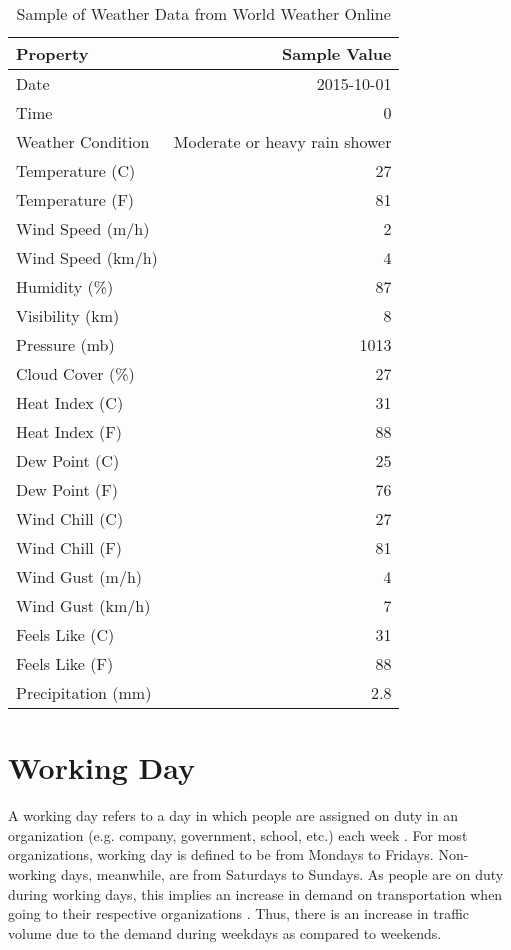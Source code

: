 \begin{table}[h]
	\centering
	\caption{Sample of Weather Data from World Weather Online}
	\label{table:sample_worldweatheronline_weather_data}
	\begin{tabular}{|l|r|}
		\hline
          Property & Sample Value \\ \hline
          Date & 2015-10-01 \\ \hline
          Time & 0 \\ \hline
          Weather Condition & Moderate or heavy rain shower \\ \hline
          Temperature (\textdegree{}C) & 27 \\ \hline
          Temperature (\textdegree{}F) & 81 \\ \hline
          Wind Speed (m/h) & 2 \\ \hline
          Wind Speed (km/h) & 4 \\ \hline
          Humidity (\%) & 87 \\ \hline
          Visibility (km) & 8 \\ \hline
          Pressure (mb) & 1013 \\ \hline
          Cloud Cover (\%) & 27 \\ \hline
          Heat Index (\textdegree{}C) & 31 \\ \hline
          Heat Index (\textdegree{}F) & 88 \\ \hline
          Dew Point (\textdegree{}C) & 25 \\ \hline
          Dew Point (\textdegree{}F) & 76 \\ \hline
          Wind Chill (\textdegree{}C) & 27 \\ \hline
          Wind Chill (\textdegree{}F) & 81 \\ \hline
          Wind Gust (m/h) & 4 \\ \hline
          Wind Gust (km/h) & 7 \\ \hline
          Feels Like (\textdegree{}C) & 31 \\ \hline
          Feels Like (\textdegree{}F) & 88 \\ \hline
          Precipitation (mm) & 2.8 \\ \hline
	\end{tabular}
\end{table}



\section{Working Day}
A working day refers to a day in which people are assigned on duty in an organization (e.g. company, government, school, etc.) each week \cite{liu2008wdcm}. For most organizations, working day is defined to be from Mondays to Fridays. Non-working days, meanwhile, are from Saturdays to Sundays. As people are on duty during working days, this implies an increase in demand on transportation when going to their respective organizations . Thus, there is an increase in traffic volume due to the demand during weekdays as compared to weekends.

